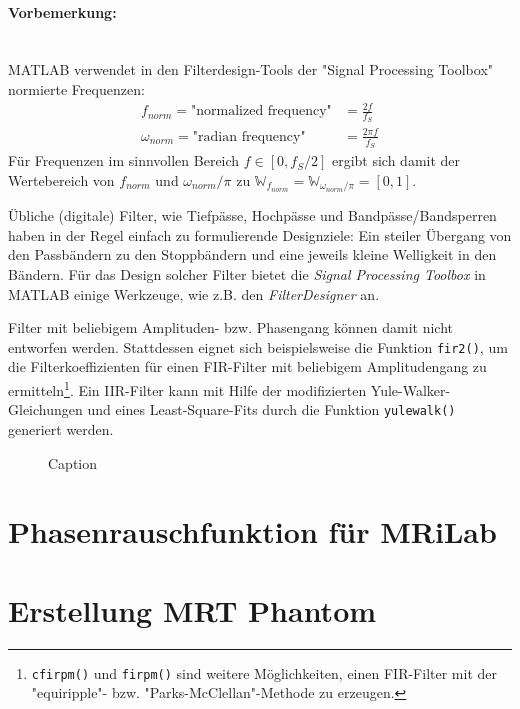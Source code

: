 \paragraph{Vorbemerkung:}\mbox{}\\
MATLAB verwendet in den Filterdesign-Tools der "Signal Processing Toolbox" normierte Frequenzen:
\begin{subequations}
	\begin{align}
	f_{norm} = \text{"normalized frequency"} &= \frac{2f}{f_S} \\
	\omega_{norm} = \text{"radian frequency"} &= \frac{2\pi f}{f_S}
	\end{align}
\end{subequations}
Für Frequenzen im sinnvollen Bereich $f\in [0,f_S/2]$ ergibt sich damit der Wertebereich von
$f_{norm}$ und $\omega_{norm}/\pi$ zu $\mathbb{W}_{f_{norm}}=\mathbb{W}_{\omega_{norm}/\pi}=[0,1]$.

Übliche (digitale) Filter, wie Tiefpässe, Hochpässe und Bandpässe/Bandsperren haben in der Regel einfach zu formulierende Designziele: Ein steiler Übergang von den Passbändern zu den Stoppbändern und eine jeweils kleine Welligkeit in den Bändern.
Für das Design solcher Filter bietet die \textit{Signal Processing Toolbox} in MATLAB einige Werkzeuge, wie z.B. den \textit{FilterDesigner} an.

Filter mit beliebigem Amplituden- bzw. Phasengang können damit nicht entworfen werden. Stattdessen eignet sich beispielsweise die Funktion \texttt{fir2()}, um die Filterkoeffizienten für einen FIR-Filter mit beliebigem Amplitudengang zu ermitteln\footnote{\texttt{cfirpm()} und \texttt{firpm()} sind weitere Möglichkeiten, einen FIR-Filter mit der "equiripple"- bzw. "Parks-McClellan"-Methode zu erzeugen.}. Ein IIR-Filter kann mit Hilfe der modifizierten Yule-Walker-Gleichungen und eines Least-Square-Fits durch die Funktion \texttt{yulewalk()} generiert werden.


\begin{figure}[H]
	\centering
	\hfill
	\caption{Caption}
\end{figure}




\section{Phasenrauschfunktion für MRiLab}

\section{Erstellung MRT Phantom}

